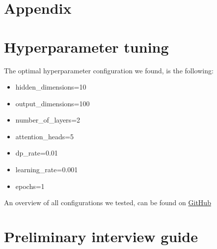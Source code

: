 \section{Appendix}
\appendix
\section{Hyperparameter tuning}
\label{app:hyperparameters}

The optimal hyperparameter configuration we found, is the following: 

\begin{itemize}
    \item hidden\_dimensions=10
    \item output\_dimensions=100
    \item number\_of\_layers=2
    \item attention\_heads=5
    \item dp\_rate=0.01
    \item learning\_rate=0.001
    \item epochs=1
\end{itemize}

An overview of all configurations we tested, can be found on \href{https://anonymous.4open.science/r/JRS_explanations-84D6/}{GitHub}

\newpage

\section{Preliminary interview guide}
\label{app:interview_guide}

